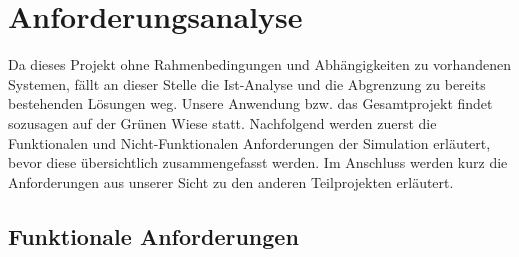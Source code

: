 \chapter{Anforderungsanalyse}

Da dieses Projekt ohne Rahmenbedingungen und Abhängigkeiten zu vorhandenen Systemen, fällt an dieser Stelle die Ist-Analyse und die Abgrenzung zu bereits bestehenden Lösungen weg. Unsere Anwendung bzw. das Gesamtprojekt findet sozusagen auf der Grünen Wiese statt. Nachfolgend werden zuerst die Funktionalen und Nicht-Funktionalen Anforderungen der Simulation erläutert, bevor diese übersichtlich zusammengefasst werden. Im Anschluss werden kurz die Anforderungen aus unserer Sicht zu den anderen Teilprojekten erläutert.
\section{Funktionale Anforderungen}
